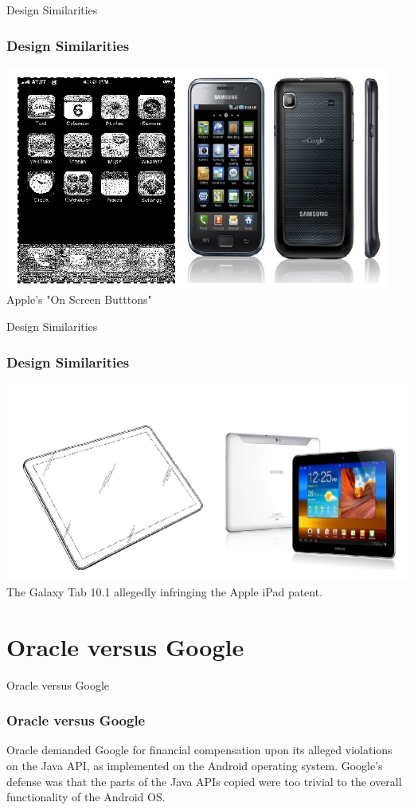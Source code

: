 \documentclass{beamer}
\begin{document}
\begin{frame}{Design Similarities}
\frametitle{Design Similarities}
	\centering
	\includegraphics[scale=0.33]{as3}\\
	Apple's "On Screen Butttons"
\end{frame}
\begin{frame}{Design Similarities}
\frametitle{Design Similarities}
	\centering
	\includegraphics[scale=0.33]{as4} \\
	The Galaxy Tab 10.1 allegedly infringing the Apple iPad patent.
\end{frame}

\section{Oracle versus Google}
\begin{frame}{Oracle versus Google}
\frametitle{Oracle versus Google}
	Oracle demanded Google for financial compensation upon its alleged violations on the Java API, \pause
	as implemented on the Android operating system. \pause
	Google's defense was that the parts of the Java APIs copied were too trivial to the overall functionality \pause
	of the Android OS.
\end{frame}
\end{document}
